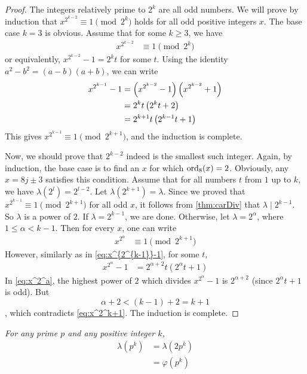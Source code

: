 \documentclass{subfile}
\begin{document}
	\begin{proof}
		The integers relatively prime to $2^k$ are all odd numbers. We will prove by induction that $x^{2^{k-2}} \equiv1\pmod{2^k}$ holds for all odd positive integers $x$. The base case $k=3$ is obvious. Assume that for some $k\geq 3$, we have
			\begin{align*}
				x^{2^{k-2}} & \equiv1\pmod{2^k}
			\end{align*}
		or equivalently, $x^{2^{k-2}} -1=2^kt$ for some $t$. Using the identity $a^2-b^2=(a-b)(a+b)$, we can write
			\begin{align}
				x^{2^{k-1}} -1
					& = \left(x^{2^{k-2}} -1\right)\left(x^{2^{k-2}} +1\right)\\
					& = 2^kt\left(2^kt +2\right)\\
					& = 2^{k+1}t \left(2^{k-1}t+1\right) \label{eq:x^{2^{k-1}}-1}
			\end{align}
		This gives $x^{2^{k-1}} \equiv 1\pmod{2^{k+1}}$, and the induction is complete.

		Now, we should prove that $2^{k-2}$ indeed is the smallest such integer. Again, by induction, the base case is to find an $x$ for which $\operatorname{ord}_8(x)=2$. Obviously, any $x=8j\pm3$ satisfies this condition. Assume that for all numbers $t$ from $1$ up to $k$, we have $\lambda(2^l)=2^{l-2}$. Let $\lambda(2^{k+1})=\lambda$. Since we proved that $x^{2^{k-1}} \equiv 1\pmod{2^{k+1}}$ for all odd $x$, it follows from \autoref{thm:carDiv} that $\lambda \mid 2^{k-1}$. So $\lambda$ is a power of $2$. If $\lambda = 2^{k-1}$, we are done. Otherwise, let $\lambda=2^\alpha$, where $1 \leq \alpha <k-1$. Then for every $x$, one can write
			\begin{align}\label{eq:x^2^k+1}
				x^{2^\alpha}
					& \equiv 1 \pmod{2^{k+1}}
			\end{align}
		However, similarly as in \eqref{eq:x^{2^{k-1}}-1}, for some $t$,
			\begin{align}\label{eq:x^2^a}
				x^{2^{\alpha}} -1
					&= 2^{\alpha+2}t \left(2^{\alpha}t+1\right)
			\end{align}
		In \eqref{eq:x^2^a}, the highest power of $2$ which divides $x^{2^{\alpha}} -1$ is $2^{\alpha+2}$ (since $2^{\alpha}t+1$ is odd). But $$\alpha+2 <(k-1)+2=k+1$$, which contradicts \eqref{eq:x^2^k+1}. The induction is complete.
	\end{proof}

	\begin{theorem}\slshape
		For any prime $p$ and any positive integer $k$,
			\begin{align*}
				\lambda(p^k)
					& =\lambda(2p^k)\\
					& =\varphi(p^k)
			\end{align*}
	\end{theorem}
\end{document}
